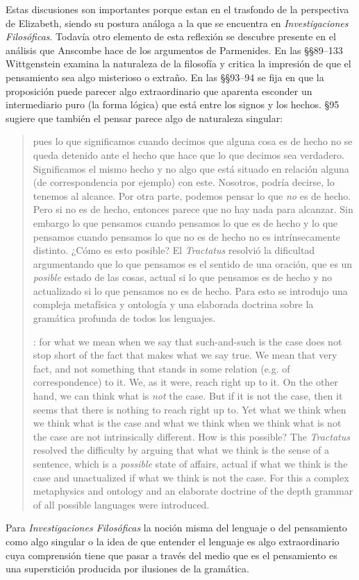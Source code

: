 Estas discusiones son importantes porque estan en el trasfondo de la perspectiva de Elizabeth, siendo su postura análoga a la que se encuentra en \emph{Investigaciones Filosóficas}. Todavía otro elemento de esta reflexión se descubre presente en el análisis que Anscombe hace de los argumentos de Parmenides. En las \S\S89--133 Wittgenstein examina la naturaleza de la filosofía y critica la impresión de que el pensamiento sea algo misterioso o extraño. En las \S\S93--94 se fija en que la proposición puede parecer algo extraordinario que aparenta esconder un intermediario puro (la forma lógica) que está entre los signos y los hechos. \S95 sugiere que también el pensar parece algo de naturaleza singular: \blockquote[{\cite[4]{hacker2000mind}}: for what we mean when we say that such-and-such is the case does not stop short of the fact that makes what we say true. We mean that very fact, and not something that stands in some relation (e.g. of correspondence) to it. We, as it were, reach right up to it. On the other hand, we can think what is \emph{not} the case. But if it is not the case, then it seems that there is nothing to reach right up to. Yet what we think when we think what is the case and what we think when we think what is not the case are not intrinsically different. How is this possible? The \emph{Tractatus} resolved the difficulty by arguing that what we think is the sense of a sentence, which is a \emph{possible} state of affairs, actual if what we think is the case and unactualized if what we think is not the case. For this a complex metaphysics and ontology and an elaborate doctrine of the depth grammar of all possible languages were introduced.]{pues lo que significamos cuando decimos que alguna cosa es de hecho no se queda detenido ante el hecho que hace que lo que decimos sea verdadero. Significamos el mismo hecho y no algo que está situado en relación alguna (de correspondencia por ejemplo) con este. Nosotros, podría decirse, lo tenemos al alcance. Por otra parte, podemos pensar lo que \emph{no} es de hecho. Pero si no es de hecho, entonces parece que no hay nada para alcanzar. Sin embargo lo que pensamos cuando pensamos lo que es de hecho y lo que pensamos cuando pensamos lo que no es de hecho no es intrínsecamente distinto. ¿Cómo es esto posible? El \emph{Tractatus} resolvió la dificultad argumentando que lo que pensamos es el sentido de una oración, que es un \emph{posible} estado de las cosas, actual si lo que pensamos es de hecho y no actualizado si lo que pensamos no es de hecho. Para esto se introdujo una compleja metafísica y ontología y una elaborada doctrina sobre la gramática profunda de todos los lenguajes.} Para \emph{Investigaciones Filosóficas} la noción misma del lenguaje o del pensamiento como algo singular o la idea de que entender el lenguaje es algo extraordinario cuya comprensión tiene que pasar a través del medio que es el pensamiento es una superstición producida por ilusiones de la gramática.

